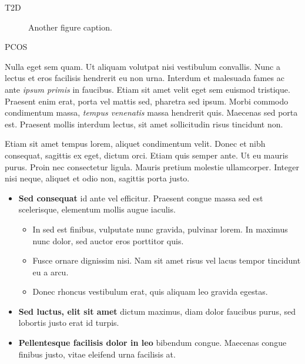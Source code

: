 \documentclass[final]{beamer}
\newlength{\colwidth}
\begin{document}
\begin{frame}[t]
\begin{columns}[t]
\begin{column}{\colwidth}
\begin{block}{T2D}
    \begin{figure}
      \centering
      \caption{Another figure caption.}
    \end{figure}

  \end{block}

  \begin{block}{PCOS}

    Nulla eget sem quam. Ut aliquam volutpat nisi vestibulum convallis. Nunc a
    lectus et eros facilisis hendrerit eu non urna. Interdum et malesuada fames
    ac ante \textit{ipsum primis} in faucibus. Etiam sit amet velit eget sem
    euismod tristique. Praesent enim erat, porta vel mattis sed, pharetra sed
    ipsum. Morbi commodo condimentum massa, \textit{tempus venenatis} massa
    hendrerit quis. Maecenas sed porta est. Praesent mollis interdum lectus,
    sit amet sollicitudin risus tincidunt non.

    Etiam sit amet tempus lorem, aliquet condimentum velit. Donec et nibh
    consequat, sagittis ex eget, dictum orci. Etiam quis semper ante. Ut eu
    mauris purus. Proin nec consectetur ligula. Mauris pretium molestie
    ullamcorper. Integer nisi neque, aliquet et odio non, sagittis porta justo.

    \begin{itemize}
      \item \textbf{Sed consequat} id ante vel efficitur. Praesent congue massa
        sed est scelerisque, elementum mollis augue iaculis.
        \begin{itemize}
          \item In sed est finibus, vulputate
            nunc gravida, pulvinar lorem. In maximus nunc dolor, sed auctor eros
            porttitor quis.
          \item Fusce ornare dignissim nisi. Nam sit amet risus vel lacus
            tempor tincidunt eu a arcu.
          \item Donec rhoncus vestibulum erat, quis aliquam leo
            gravida egestas.
        \end{itemize}
      \item \textbf{Sed luctus, elit sit amet} dictum maximus, diam dolor
        faucibus purus, sed lobortis justo erat id turpis.
      \item \textbf{Pellentesque facilisis dolor in leo} bibendum congue.
        Maecenas congue finibus justo, vitae eleifend urna facilisis at.
    \end{itemize}


\end{block}
\end{column}
\end{columns}
\end{frame}
\end{document}
